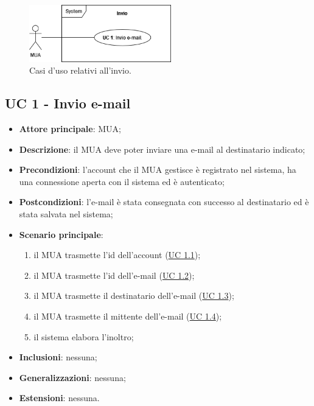 
\begin{figure}[H]
    \includegraphics[width=0.55\textwidth]{sections/uc_imgs/UC-invio.png}
    \centering
    \caption{Casi d'uso relativi all'invio.}
\end{figure}

\subsection{UC 1 - Invio e-mail} \label{sec:UC1}
    
    \begin{itemize}
        \item \textbf{Attore principale}: MUA;
        \item \textbf{Descrizione}: il MUA deve poter inviare una e-mail al destinatario indicato;
        \item \textbf{Precondizioni}: l’account che il MUA gestisce è registrato nel sistema, ha una connessione aperta con il sistema ed è autenticato;
        \item \textbf{Postcondizioni}: l'e-mail è stata consegnata con successo al destinatario ed è stata salvata nel sistema;
        \item \textbf{Scenario principale}:
            \begin{enumerate}
                \item il MUA trasmette l'id dell'account (\hyperref[sec:UC1.1]{UC 1.1});
                \item il MUA trasmette l'id dell'e-mail (\hyperref[sec:UC1.2]{UC 1.2});
                \item il MUA trasmette il destinatario dell'e-mail (\hyperref[sec:UC1.3]{UC 1.3});
                \item il MUA trasmette il mittente dell'e-mail (\hyperref[sec:UC1.4]{UC 1.4});
                \item il sistema elabora l'inoltro;
            \end{enumerate}
        \item \textbf{Inclusioni}: nessuna;
        \item \textbf{Generalizzazioni}: nessuna;
        \item \textbf{Estensioni}: nessuna.
    \end{itemize}


